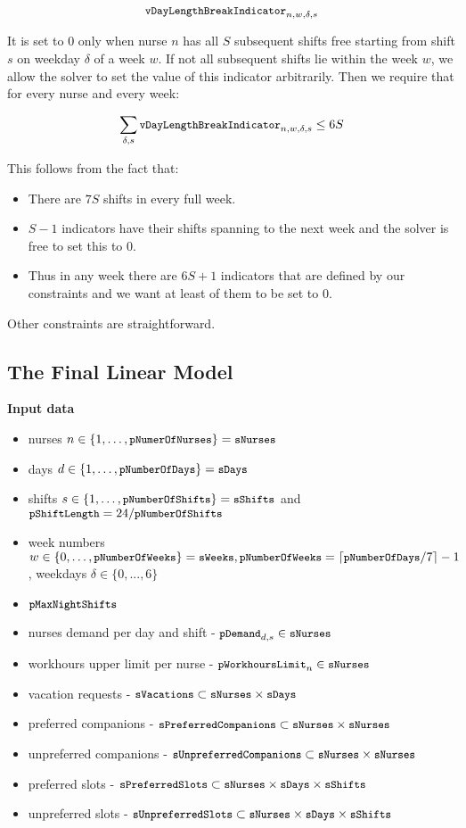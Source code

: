 \[ \texttt{\small vDayLengthBreakIndicator}_{n, w, \delta, s} \]

It is set to $0$ only when nurse $n$ has all $S$ subsequent shifts free starting from shift $s$ on weekday $\delta$ of a week $w$. If not all subsequent shifts lie within the week $w$, we allow the solver to set the value of this indicator arbitrarily. Then we require that for every nurse and every week:

\[ \sum_{\delta, s} \texttt{\small vDayLengthBreakIndicator}_{n, w, \delta, s} \le 6S \]

This follows from the fact that:
\begin{itemize}
    \item There are $7S$ shifts in every full week.
    \item $S - 1$ indicators have their shifts spanning to the next week and the solver is free to set this to 0.
    \item Thus in any week there are $6S + 1$ indicators that are defined by our constraints and we want at least of them to be set to $0$.
\end{itemize}

Other constraints are straightforward.


\subsection{The Final Linear Model}

\noindent\textbf{Input data}
\begin{itemize}
    \item nurses $n\in \{1, \dots, \texttt{\small pNumerOfNurses}\} = \texttt{\small sNurses}$
    \item days $d\in \{1, \dots, \texttt{\small pNumberOfDays}\} = \texttt{\small sDays}$
    \item shifts $s\in \{1, \dots, \texttt{\small pNumberOfShifts}\} = \texttt{\small sShifts}$ and $\texttt{\small pShiftLength} = 24 / \texttt{\small pNumberOfShifts}$
    \item week numbers $w\in\{0, \dots, \texttt{\small pNumberOfWeeks}\} = \texttt{\small sWeeks}, \texttt{\small pNumberOfWeeks}=\lceil \texttt{\small pNumberOfDays}/7 \rceil - 1$, weekdays $\delta \in \{0, ..., 6\}$
    \item $\texttt{\small pMaxNightShifts}$
    \item nurses demand per day and shift - $\texttt{\small pDemand}_{d,s} \in \texttt{\small sNurses}$
    \item workhours upper limit per nurse - $\texttt{\small pWorkhoursLimit}_n \in \texttt{\small sNurses}$
    \item vacation requests - $\texttt{\small sVacations} \subset \texttt{\small sNurses} \times \texttt{\small sDays}$
    \item preferred companions - $\texttt{\small sPreferredCompanions} \subset \texttt{\small sNurses} \times \texttt{\small sNurses}$
    \item unpreferred companions - $\texttt{\small sUnpreferredCompanions} \subset \texttt{\small sNurses} \times \texttt{\small sNurses}$
    \item preferred slots - $\texttt{\small sPreferredSlots} \subset \texttt{\small sNurses} \times \texttt{\small sDays} \times \texttt{\small sShifts}$
    \item unpreferred slots - $\texttt{\small sUnpreferredSlots} \subset \texttt{\small sNurses} \times \texttt{\small sDays} \times \texttt{\small sShifts}$
\end{itemize}

